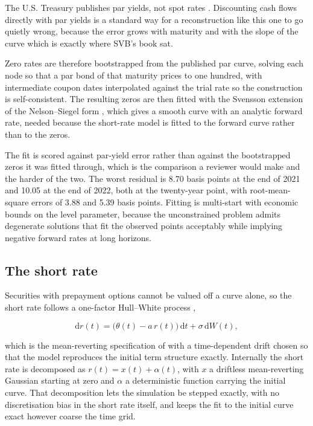 The U.S. Treasury publishes par yields, not spot rates \citep{Treasury}. Discounting
cash flows directly with par yields is a standard way for a reconstruction like this
one to go
quietly wrong, because the error grows with maturity and with the slope of the curve
which is exactly where SVB's book sat.

Zero rates are therefore bootstrapped from the published par curve, solving each node
so that a par bond of that maturity prices to one hundred, with intermediate coupon
dates interpolated against the trial rate so the construction is self-consistent. The
resulting zeros are then fitted with the Svensson extension of the Nelson--Siegel
form \citep{NelsonSiegel1987, Svensson1994}, which gives a smooth curve with an
analytic forward rate, needed because the short-rate model is fitted to the forward
curve rather than to the zeros.

The fit is scored against par-yield error rather than against the bootstrapped zeros
it was fitted through, which is the comparison a reviewer would make and the harder of
the two. The worst residual is 8.70 basis points at the end of 2021 and 10.05 at the
end of 2022, both at the twenty-year point, with root-mean-square errors of 3.88 and
5.39 basis points. Fitting is multi-start with economic bounds on the level
parameter, because the unconstrained problem admits degenerate solutions that fit the
observed points acceptably while implying negative forward rates at long horizons.

\subsection{The short rate}

Securities with prepayment options cannot be valued off a curve alone, so the short
rate follows a one-factor Hull--White process \citep{HullWhite1990},

\begin{equation}
\mathrm{d}r(t) = \bigl(\theta(t) - a\,r(t)\bigr)\,\mathrm{d}t + \sigma\,\mathrm{d}W(t),
\label{eq:hw}
\end{equation}

which is the mean-reverting specification of \citet{Vasicek1977} with a
time-dependent drift chosen so that the model reproduces the initial term structure
exactly. Internally the short rate is decomposed as $r(t) = x(t) + \alpha(t)$, with
$x$ a driftless mean-reverting Gaussian starting at zero and $\alpha$ a deterministic
function carrying the initial curve. That decomposition lets the simulation be
stepped exactly, with no discretisation bias in the short rate itself, and keeps the
fit to the initial curve exact however coarse the time grid.

